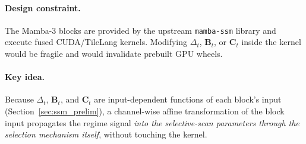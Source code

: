 \documentclass{article}
\begin{document}
\paragraph{Design constraint.}
The Mamba-3 blocks are provided by the upstream \texttt{mamba-ssm}
library and execute fused CUDA/TileLang kernels.  Modifying $\Delta_t$,
$\mathbf{B}_t$, or $\mathbf{C}_t$ inside the kernel would be fragile and
would invalidate prebuilt GPU wheels.

\paragraph{Key idea.}
Because $\Delta_t$, $\mathbf{B}_t$, and $\mathbf{C}_t$ are
input-dependent functions of each block's input
(Section~\ref{sec:ssm_prelim}), a channel-wise affine transformation of
the block input propagates the regime signal \emph{into the
selective-scan parameters through the selection mechanism itself},
without touching the kernel.
\end{document}
